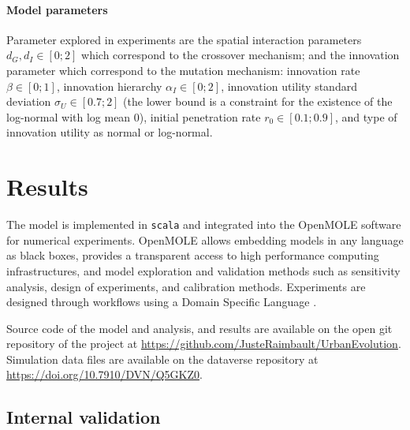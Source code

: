 \documentclass[letterpaper]{article}
\begin{document}
\paragraph{Model parameters}

Parameter explored in experiments are the spatial interaction parameters $d_G,d_I \in \left[0;2\right]$ which correspond to the crossover mechanism; and the innovation parameter which correspond to the mutation mechanism: innovation rate $\beta \in \left[0;1\right]$, innovation hierarchy $\alpha_I \in \left[0;2\right]$, innovation utility standard deviation $\sigma_U \in \left[ 0.7;2\right]$ (the lower bound is a constraint for the existence of the log-normal with log mean 0), initial penetration rate $r_0 \in \left[0.1;0.9\right]$, and type of innovation utility as normal or log-normal.




\section{Results}

The model is implemented in \texttt{scala} and integrated into the OpenMOLE software \citep{reuillon2013openmole} for numerical experiments. OpenMOLE allows embedding models in any language as black boxes, provides a transparent access to high performance computing infrastructures, and model exploration and validation methods such as sensitivity analysis, design of experiments, and calibration methods. Experiments are designed through workflows using a Domain Specific Language \citep{passerat2017reproducible}.

Source code of the model and analysis, and results are available on the open git repository of the project at \url{https://github.com/JusteRaimbault/UrbanEvolution}. Simulation data files are available on the dataverse repository at \url{https://doi.org/10.7910/DVN/Q5GKZ0}.

\subsection{Internal validation}
\end{document}
